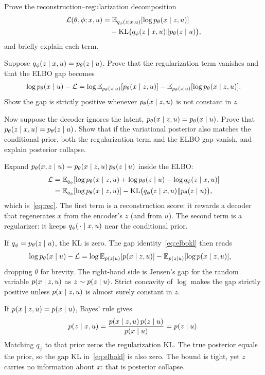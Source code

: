 \begin{hwqbox}
Prove the reconstruction--regularization decomposition
\begin{align*}
\mathcal L(\theta,\phi;x,u)
&=\mathbb{E}_{q_\phi(z\mid x,u)}[\log p_\theta(x\mid z,u)]\\
&\quad-\mathrm{KL}\bigl(q_\phi(z\mid x,u)\Vert p_\theta(z\mid u)\bigr),
\end{align*}
and briefly explain each term.

Suppose $q_\phi(z\mid x,u)=p_\theta(z\mid u)$. Prove that the regularization term vanishes and that the ELBO gap becomes
\[
\log p_\theta(x\mid u)-\mathcal L
=\log\mathbb{E}_{p_\theta(z\mid u)}[p_\theta(x\mid z,u)]
-\mathbb{E}_{p_\theta(z\mid u)}[\log p_\theta(x\mid z,u)].
\]
Show the gap is strictly positive whenever $p_\theta(x\mid z,u)$ is not constant in $z$.

Now suppose the decoder ignores the latent, $p_\theta(x\mid z,u)=p_\theta(x\mid u)$. Prove that
$p_\theta(z\mid x,u)=p_\theta(z\mid u)$. Show that if the variational posterior also matches the conditional prior, both the regularization term and the ELBO gap vanish, and explain posterior collapse.
\end{hwqbox}
\begin{hwsolbox}
Expand $p_\theta(x,z\mid u)=p_\theta(x\mid z,u)\,p_\theta(z\mid u)$ inside the ELBO:
\begin{align*}
\mathcal L
&=\mathbb{E}_{q_\phi}[\log p_\theta(x\mid z,u)+\log p_\theta(z\mid u)-\log q_\phi(z\mid x,u)]\\
&=\mathbb{E}_{q_\phi}[\log p_\theta(x\mid z,u)]
-\mathrm{KL}\bigl(q_\phi(z\mid x,u)\Vert p_\theta(z\mid u)\bigr),
\end{align*}
which is~\eqref{eq:rec}. The first term is a reconstruction score: it rewards a decoder that regenerates $x$ from the encoder's $z$ (and from $u$). The second term is a regularizer: it keeps $q_\phi(\,\cdot\mid x,u)$ near the conditional prior.

If $q_\phi=p_\theta(z\mid u)$, the KL is zero. The gap identity~\eqref{eq:elbokl} then reads
\begin{align*}
\log p_\theta(x\mid u)-\mathcal L
&=\log\mathbb{E}_{p(z\mid u)}[p(x\mid z,u)]
-\mathbb{E}_{p(z\mid u)}[\log p(x\mid z,u)],
\end{align*}
dropping $\theta$ for brevity. The right-hand side is Jensen's gap for the random variable $p(x\mid z,u)$ as $z\sim p(z\mid u)$. Strict concavity of $\log$ makes the gap strictly positive unless $p(x\mid z,u)$ is almost surely constant in $z$.

If $p(x\mid z,u)=p(x\mid u)$, Bayes' rule gives
\[
p(z\mid x,u)
=\frac{p(x\mid z,u)\,p(z\mid u)}{p(x\mid u)}
=p(z\mid u).
\]
Matching $q_\phi$ to that prior zeros the regularization KL. The true posterior equals the prior, so the gap KL in~\eqref{eq:elbokl} is also zero. The bound is tight, yet $z$ carries no information about $x$: that is posterior collapse.
\end{hwsolbox}

